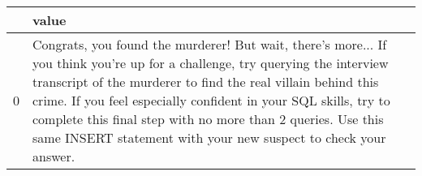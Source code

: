 \begin{tabular}{ll}
\toprule
 & value \\
\midrule
0 & Congrats, you found the murderer! But wait, there's more... If you think you're up for a challenge, try querying the interview transcript of the murderer to find the real villain behind this crime. If you feel especially confident in your SQL skills, try to complete this final step with no more than 2 queries. Use this same INSERT statement with your new suspect to check your answer. \\
\bottomrule
\end{tabular}
